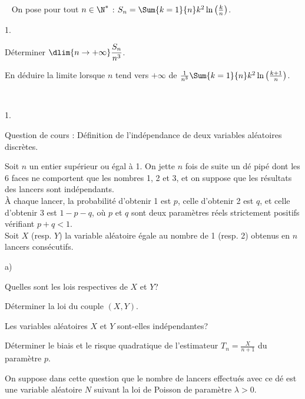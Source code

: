 \documentclass[11pt]{article}%
\begin{document}
\begin{exerciceSP}~
  On pose pour tout $n \in \N^*$ : $S_n = \Sum{k=1}{n} k^2
  \ln \left( \frac{ k }{ n } \right)$.
  \begin{noliste}{1.}
    \setlength{\itemsep}{2mm}
  \item Déterminer $\dlim{n \rightarrow + \infty} \dfrac{S_n}{ n^3}$.

  \item En déduire la limite lorsque $n$ tend vers $+\infty$ de
    $\frac{1}{n^3} \Sum{k=1}{n} k^2 \ln \left( \frac{ k+1 }{ n }
    \right)$.

  \end{noliste}
\end{exerciceSP}


\newpage


\begin{exerciceAP}~\\
  \begin{noliste}{1.}
    \setlength{\itemsep}{2mm}
  \item Question de cours : Définition de l'indépendance de deux
    variables aléatoires discrètes.

  \item Soit $n$ un entier supérieur ou égal à 1. On jette $n$ fois de
    suite un dé pipé dont les 6 faces ne comportent que les nombres 1,
    2 et 3, et on suppose que les résultats des lancers sont
    indépendants.\\[.2cm]
    À chaque lancer, la probabilité d'obtenir 1 est $p$, celle
    d'obtenir 2 est $q$, et celle d'obtenir 3 est $1-p-q$, où $p$ et
    $q$ sont deux paramètres réels strictement positifs vérifiant
    $p+q<1$.\\

    Soit $X$ (resp. $Y$) la variable aléatoire égale au nombre de 1
    (resp. 2) obtenus en $n$ lancers consécutifs. 
    \begin{noliste}{a)}
    \setlength{\itemsep}{2mm}
    \item Quelles sont les lois respectives de $X$ et $Y$?
    \item Déterminer la loi du couple $(X,Y)$.
    \item Les variables aléatoires $X$ et $Y$ sont-elles indépendantes?
    \item Déterminer le biais et le risque quadratique de l'estimateur
      $T_n = \frac{ X }{ n+1 }$ du paramètre $p$.
    \end{noliste}

  \item On suppose dans cette question que le nombre de lancers
    effectués avec ce dé est une variable aléatoire $N$ suivant la loi
    de Poisson de paramètre $\lambda > 0$.\\


\end{noliste}
\end{exerciceAP}
\end{document}
